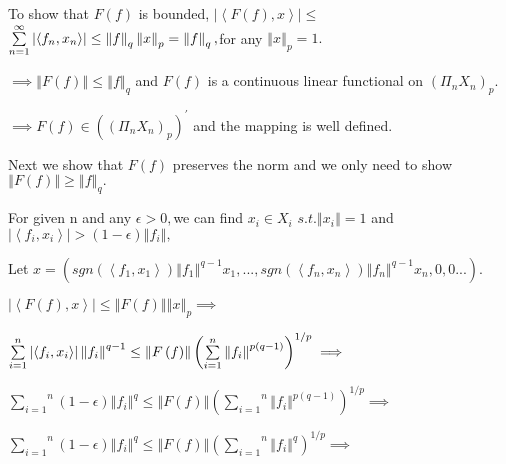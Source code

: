 \documentclass{article}
\begin{document}
To show that $F\left( f\right) $ is bounded, $\left\vert \left\langle
F\left( f\right) ,x\right\rangle \right\vert \leq $ $\overset{\infty }{%
\underset{n=1}{\sum }}\left\vert \left\langle f_{n},x_{n}\right\rangle
\right\vert \leq \left\Vert f\right\Vert _{q}\left\Vert x\right\Vert
_{p}=\left\Vert f\right\Vert _{q},$for any $\left\Vert x\right\Vert _{p}=1.$

$\implies \left\Vert F\left( f\right) \right\Vert \leq \left\Vert
f\right\Vert _{q}$ and $F\left( f\right) $ is a continuous linear functional
on $\left( \Pi _{n}X_{n}\right) _{p}.$

$\implies F\left( f\right) \in \left( \left( \Pi _{n}X_{n}\right)
_{p}\right) ^{\prime }$ and the mapping is well defined.

Next we show that $F\left( f\right) $ preserves the norm and we only need to
show $\left\Vert F\left( f\right) \right\Vert \geq \left\Vert f\right\Vert
_{q}.$

\bigskip For given n and any $\epsilon >0,$we can find $x_{i}\in X_{i}$ $%
s.t.\left\Vert x_{i}\right\Vert =1$ and $\left\vert \left\langle
f_{i},x_{i}\right\rangle \right\vert >\left( 1-\epsilon \right) \left\Vert
f_{i}\right\Vert ,$

Let $x=\left( sgn\left( \left\langle f_{1},x_{1}\right\rangle \right)
\left\Vert f_{1}\right\Vert ^{q-1}x_{1},...,sgn\left( \left\langle
f_{n},x_{n}\right\rangle \right) \left\Vert f_{n}\right\Vert
^{q-1}x_{n},0,0...\right) .$

$\left\vert \left\langle F\left( f\right) ,x\right\rangle \right\vert \leq
\left\Vert F\left( f\right) \right\Vert \left\Vert x\right\Vert _{p}\implies 
$

$\overset{n}{\underset{i=1}{\sum }}\left\vert \left\langle
f_{i},x_{i}\right\rangle \right\vert \left\Vert f_{i}\right\Vert ^{q-1}\leq
\left\Vert F\left( f\right) \right\Vert \left( \overset{n}{\underset{i=1}{%
\sum }}\left\Vert f_{i}\right\Vert ^{p\left( q-1\right) }\right)
^{1/p}\implies $

\bigskip $\overset{n}{\underset{i=1}{\sum }}\left( 1-\epsilon \right)
\left\Vert f_{i}\right\Vert ^{q}\leq \left\Vert F\left( f\right) \right\Vert
\left( \overset{n}{\underset{i=1}{\sum }}\left\Vert f_{i}\right\Vert
^{p\left( q-1\right) }\right) ^{1/p}\implies $

$\overset{n}{\underset{i=1}{\sum }}\left( 1-\epsilon \right) \left\Vert
f_{i}\right\Vert ^{q}\leq \left\Vert F\left( f\right) \right\Vert \left( 
\overset{n}{\underset{i=1}{\sum }}\left\Vert f_{i}\right\Vert ^{q}\right)
^{1/p}\implies $
\end{document}

